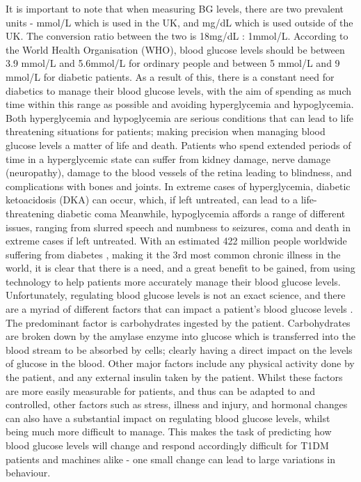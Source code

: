     It is important to note that when measuring BG levels, there are two prevalent units - mmol/L which is used in the UK, and mg/dL which is used outside of the UK. The conversion ratio between the two is 18mg/dL : 1mmol/L. According to the World Health Organisation (WHO), blood glucose levels should be between 3.9 mmol/L and 5.6mmol/L \cite{WHOBGL} for ordinary people and between 5 mmol/L and 9 mmol/L for diabetic patients.   As a result of this, there is a constant need for diabetics to manage their blood glucose levels, with the aim of spending as much time within this range as possible and avoiding hyperglycemia and hypoglycemia. Both hyperglycemia and hypoglycemia are serious conditions that can lead to life threatening situations for patients; making precision when managing blood glucose levels a matter of life and death. Patients who spend extended periods of time in a hyperglycemic state can suffer from kidney damage, nerve damage (neuropathy), damage to the blood vessels of the retina leading to blindness, and complications with bones and joints. In extreme cases of hyperglycemia, diabetic ketoacidosis (DKA) can occur, which, if left untreated, can lead to a life-threatening diabetic coma \cite{mayohyper} Meanwhile, hypoglycemia affords a range of different issues, ranging from slurred speech and numbness to seizures, coma and death in extreme cases if left untreated\cite{adahypo}. 
    \newline
    With an estimated 422 million people worldwide suffering from diabetes \cite{world_2019}, making it the 3rd most common chronic illness in the world, it is clear that there is a need, and a great benefit to be gained, from using technology to help patients more accurately manage their blood glucose levels. Unfortunately, regulating blood glucose levels is not an exact science, and there are a myriad of different factors that can impact a patient's blood glucose levels \cite{bglfactors}. The predominant factor is carbohydrates ingested by the patient. Carbohydrates are broken down by the amylase enzyme into glucose which is transferred into the blood stream to be absorbed by cells; clearly having a direct impact on the levels of glucose in the blood. Other major factors include any physical activity done by the patient, and any external insulin taken by the patient. Whilst these factors are more easily measurable for patients, and thus can be adapted to and controlled, other factors such as stress, illness and injury, and hormonal changes can also have a substantial impact on regulating blood glucose levels, whilst being much more difficult to manage. This makes the task of predicting how blood glucose levels will change and respond accordingly difficult for T1DM patients and machines alike - one small change can lead to large variations in behaviour.  

